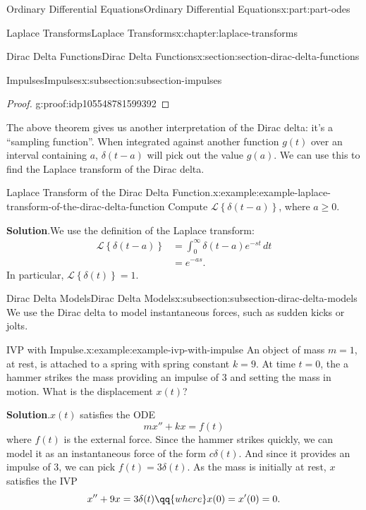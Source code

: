 \documentclass[oneside,10pt,]{book}
\newcommand{\blocktitlefont}{\relax}
\numberwithin{equation}{part}
\newcommand{\Laplace}[1]{\mathcal{L}\left\{#1\right\}}
\newcommand{\amp}{&}
\begin{document}
\begin{partptx}{Ordinary Differential Equations}{}{Ordinary Differential Equations}{}{}{x:part:part-odes}
\begin{chapterptx}{Laplace Transforms}{}{Laplace Transforms}{}{}{x:chapter:laplace-transforms}
\begin{sectionptx}{Dirac Delta Functions}{}{Dirac Delta Functions}{}{}{x:section:section-dirac-delta-functions}
\begin{subsectionptx}{Impulses}{}{Impulses}{}{}{x:subsection:subsection-impulses}
\begin{proof}{}{g:proof:idp105548781599392}
%
\end{proof}
The above theorem gives us another interpretation of the Dirac delta: it's a ``sampling function''. When integrated against another function \(g(t)\) over an interval containing \(a\), \(\delta(t-a)\) will pick out the value \(g(a)\). We can use this to find the Laplace transform of the Dirac delta.%
\begin{example}{Laplace Transform of the Dirac Delta Function.}{x:example:example-laplace-transform-of-the-dirac-delta-function}%
Compute \(\Laplace{\delta(t-a)}\), where \(a\geq0\).%
\par\smallskip%
\noindent\textbf{\blocktitlefont Solution}.\hypertarget{g:solution:idp105548781604384}{}\quad{}We use the definition of the Laplace transform:%
\begin{align*}
\Laplace{\delta(t-a)} \amp= \int_{0}^{\infty}\delta(t-a)e^{-st}\,dt\\
\amp= e^{-as}\text{.}
\end{align*}
In particular, \(\Laplace{\delta(t)} = 1\).%
\end{example}
\end{subsectionptx}
%
%
\typeout{************************************************}
\typeout{************************************************}
%
\begin{subsectionptx}{Dirac Delta Models}{}{Dirac Delta Models}{}{}{x:subsection:subsection-dirac-delta-models}
We use the Dirac delta to model instantaneous forces, such as sudden kicks or jolts.%
\begin{example}{IVP with Impulse.}{x:example:example-ivp-with-impulse}%
An object of mass \(m=1\), at rest, is attached to a spring with spring constant \(k=9\). At time \(t=0\), the a hammer strikes the mass providing an impulse of \(3\) and setting the mass in motion. What is the displacement \(x(t)\)?%
\par\smallskip%
\noindent\textbf{\blocktitlefont Solution}.\hypertarget{g:solution:idp105548781609888}{}\quad{}\(x(t)\) satisfies the ODE%
\begin{equation*}
mx''+kx = f(t)
\end{equation*}
where \(f(t)\) is the external force. Since the hammer strikes quickly, we can model it as an instantaneous force of the form \(c\delta(t)\). And since it provides an impulse of \(3\), we can pick \(f(t) = 3\delta(t)\). As the mass is initially at rest, \(x\) satisfies the IVP%
\begin{equation*}
x''+9x = 3\delta(t)\qq{where}x(0) = x'(0) = 0.

\end{equation*}
\end{example}
\end{subsectionptx}
\end{sectionptx}
\end{chapterptx}
\end{partptx}
\end{document}
